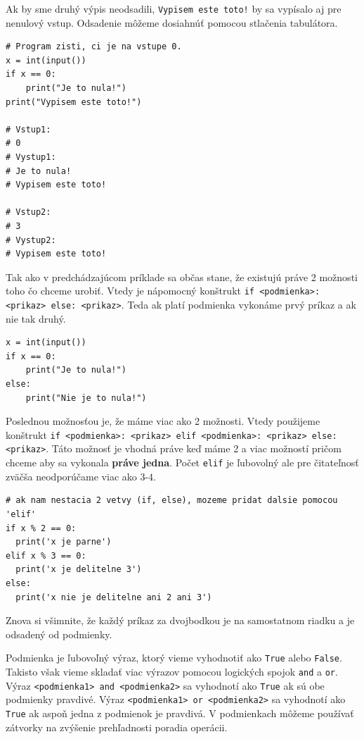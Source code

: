 \documentclass{article}
\begin{document}
Ak by sme druhý výpis neodsadili, \texttt{Vypisem este toto!} by sa vypísalo aj pre nenulový vstup. Odsadenie môžeme dosiahnúť pomocou stlačenia tabulátora.

\begin{lstlisting}
# Program zisti, ci je na vstupe 0.
x = int(input())
if x == 0:
    print("Je to nula!")
print("Vypisem este toto!")
    
# Vstup1:
# 0
# Vystup1:
# Je to nula!
# Vypisem este toto!

# Vstup2:
# 3
# Vystup2:
# Vypisem este toto!
\end{lstlisting}

Tak ako v predchádzajúcom príklade sa občas stane, že existujú práve 2 možnosti toho čo chceme urobiť. Vtedy je nápomocný konštrukt \texttt{if <podmienka>: <prikaz> else: <prikaz>}. Teda ak platí podmienka vykonáme prvý príkaz a ak nie tak druhý.

\begin{lstlisting}
x = int(input())
if x == 0:
    print("Je to nula!")
else:
    print("Nie je to nula!")
\end{lstlisting}

Poslednou možnosťou je, že máme viac ako 2 možnosti. Vtedy použijeme konštrukt \texttt{if <podmienka>: <prikaz> elif <podmienka>: <prikaz> else: <prikaz>}.
Táto možnosť je vhodná práve keď máme 2 a viac možností pričom chceme aby sa vykonala \textbf{práve jedna}. Počet \texttt{elif} je ľubovolný ale pre čitateľnosť zväčša neodporúčame viac ako $3$-$4$.

\begin{lstlisting}
# ak nam nestacia 2 vetvy (if, else), mozeme pridat dalsie pomocou 'elif'
if x % 2 == 0:
  print('x je parne')
elif x % 3 == 0:
  print('x je delitelne 3')
else:
  print('x nie je delitelne ani 2 ani 3')
\end{lstlisting}
Znova si všimnite, že každý príkaz za dvojbodkou je na samostatnom riadku a je odsadený od podmienky.

Podmienka je ľubovoľný výraz, ktorý vieme vyhodnotiť ako \texttt{True} alebo \texttt{False}.
Takisto však vieme skladať viac výrazov pomocou logických spojok \texttt{and} a \texttt{or}.
Výraz \texttt{<podmienka1> and <podmienka2>} sa vyhodnotí ako \texttt{True} ak sú obe podmienky pravdivé. 
Výraz \texttt{<podmienka1> or <podmienka2>} sa vyhodnotí ako \texttt{True} ak aspoň jedna z podmienok je pravdivá.
V podmienkach môžeme používať zátvorky na zvýšenie prehľadnosti poradia operácii.
\end{document}
